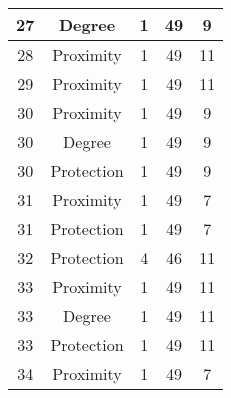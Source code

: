 \documentclass[results.tex]{subfiles}
\begin{document}
\begin{center}
\begin{tabular}{| c || c | c | c | c |}
            \hline
            27                      & Degree                       & 1                      & 49                      & 9                    \\
            \hline
            28                      & Proximity                    & 1                      & 49                      & 11                   \\
            \hline
            29                      & Proximity                    & 1                      & 49                      & 11                   \\
            \hline
            30                      & Proximity                    & 1                      & 49                      & 9                    \\
            \hline
            30                      & Degree                       & 1                      & 49                      & 9                    \\
            \hline
            30                      & Protection                   & 1                      & 49                      & 9                    \\
            \hline
            31                      & Proximity                    & 1                      & 49                      & 7                    \\
            \hline
            31                      & Protection                   & 1                      & 49                      & 7                    \\
            \hline
            32                      & Protection                   & 4                      & 46                      & 11                   \\
            \hline
            33                      & Proximity                    & 1                      & 49                      & 11                   \\
            \hline
            33                      & Degree                       & 1                      & 49                      & 11                   \\
            \hline
            33                      & Protection                   & 1                      & 49                      & 11                   \\
            \hline
            34                      & Proximity                    & 1                      & 49                      & 7                    \\

\end{tabular}
\end{center}
\end{document}
